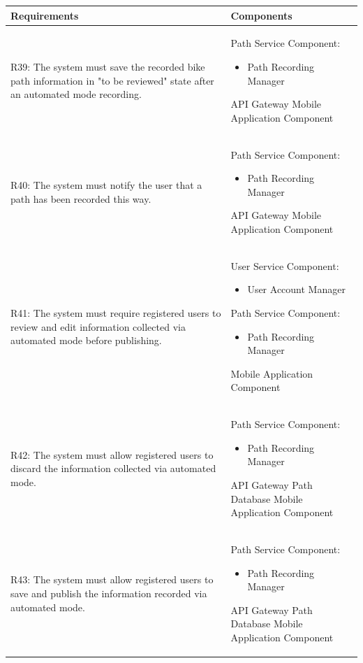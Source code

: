 \newpage
\begin{table}[ht]
\begin{tabular}{|p{9cm}|p{6cm}|}
\hline
\textbf{Requirements}      & \multicolumn{1}{l|}{\textbf{Components}}\\ \hline
R39: The system must save the recorded bike path information in "to be reviewed" state after an automated mode recording. 
&
Path Service Component:
\begin{itemize}
    \item Path Recording Manager
\end{itemize}
API Gateway
\newline
Mobile Application Component
\\ \hline
R40: The system must notify the user that a path has been recorded this way. 
&
Path Service Component:
\begin{itemize}
    \item Path Recording Manager
\end{itemize}
API Gateway
\newline
Mobile Application Component
\\ \hline
R41: The system must require registered users to review and edit information collected via automated mode before publishing. 
&
User Service Component:
\begin{itemize}
    \item User Account Manager
\end{itemize}
Path Service Component:
\begin{itemize}
    \item Path Recording Manager
\end{itemize}
Mobile Application Component
\\ \hline
R42: The system must allow registered users to discard the information collected via automated mode. 
&
Path Service Component:
\begin{itemize}
    \item Path Recording Manager
\end{itemize}
API Gateway
\newline
Path Database
\newline
Mobile Application Component
\\ \hline
R43: The system must allow registered users to save and publish the information recorded via automated mode.
&
Path Service Component:
\begin{itemize}
    \item Path Recording Manager
\end{itemize}
API Gateway
\newline
Path Database
\newline
Mobile Application Component
\\ \hline
\end{tabular}
\end{table}
\newpage
